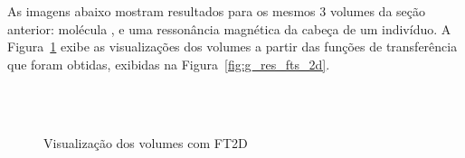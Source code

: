 	As imagens abaixo mostram resultados para os mesmos 3 volumes da seção anterior: molécula ,  e uma ressonância magnética da cabeça de um indivíduo. A Figura~\ref{fig:g_res_vis_2d} exibe as visualizações dos volumes a partir das funções de transferência que foram obtidas, exibidas na Figura~\ref{fig:g_res_fts_2d}.
	
\begin{figure}[h]
	\centering
	\\
	\\
	\caption{Visualização dos volumes com FT2D}
	\label{fig:g_res_vis_2d}
\end{figure}

